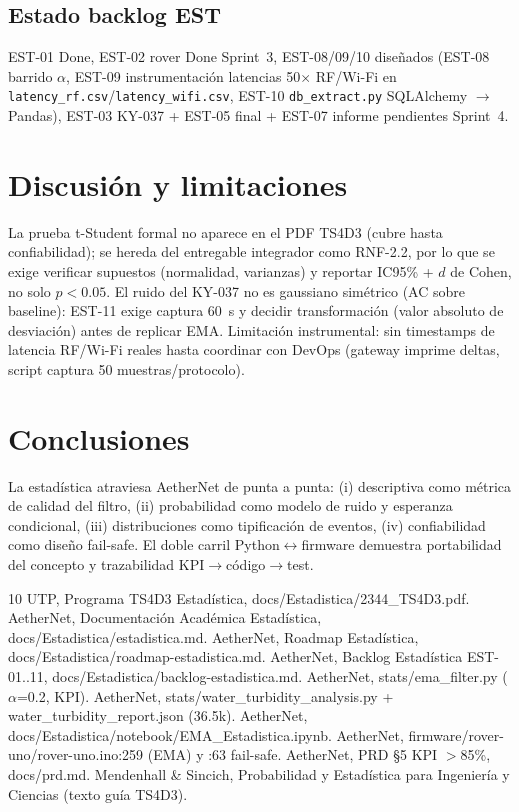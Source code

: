 \documentclass[conference]{IEEEtran}
\begin{document}
\subsection{Estado backlog EST}
EST-01 Done, EST-02 rover Done Sprint~3, EST-08/09/10 diseñados (EST-08 barrido $\alpha$, EST-09 instrumentación latencias 50$\times$ RF/Wi-Fi en \texttt{latency\_rf.csv}/\texttt{latency\_wifi.csv}, EST-10 \texttt{db\_extract.py} SQLAlchemy $\rightarrow$ Pandas), EST-03 KY-037 + EST-05 final + EST-07 informe pendientes Sprint~4.

\section{Discusión y limitaciones}
La prueba t-Student formal no aparece en el PDF TS4D3 (cubre hasta confiabilidad); se hereda del entregable integrador como RNF-2.2, por lo que se exige verificar supuestos (normalidad, varianzas) y reportar IC95\% + $d$ de Cohen, no solo $p<0.05$. El ruido del KY-037 no es gaussiano simétrico (AC sobre baseline): EST-11 exige captura 60~s y decidir transformación (valor absoluto de desviación) antes de replicar EMA. Limitación instrumental: sin timestamps de latencia RF/Wi-Fi reales hasta coordinar con DevOps (gateway imprime deltas, script captura 50 muestras/protocolo).

\section{Conclusiones}
La estadística atraviesa AetherNet de punta a punta: (i) descriptiva como métrica de calidad del filtro, (ii) probabilidad como modelo de ruido y esperanza condicional, (iii) distribuciones como tipificación de eventos, (iv) confiabilidad como diseño fail-safe. El doble carril Python$\leftrightarrow$firmware demuestra portabilidad del concepto y trazabilidad KPI$\rightarrow$código$\rightarrow$test.

\begin{thebibliography}{10}
 UTP, Programa TS4D3 Estadística, docs/Estadistica/2344\_TS4D3.pdf.
 AetherNet, Documentación Académica Estadística, docs/Estadistica/estadistica.md.
 AetherNet, Roadmap Estadística, docs/Estadistica/roadmap-estadistica.md.
 AetherNet, Backlog Estadística EST-01..11, docs/Estadistica/backlog-estadistica.md.
 AetherNet, stats/ema\_filter.py ($\alpha$=0.2, KPI).
 AetherNet, stats/water\_turbidity\_analysis.py + water\_turbidity\_report.json (36.5k).
 AetherNet, docs/Estadistica/notebook/EMA\_Estadistica.ipynb.
 AetherNet, firmware/rover-uno/rover-uno.ino:259 (EMA) y :63 fail-safe.
 AetherNet, PRD \S5 KPI $>$85\%, docs/prd.md.
 Mendenhall \& Sincich, Probabilidad y Estadística para Ingeniería y Ciencias (texto guía TS4D3).
\end{thebibliography}
\end{document}
